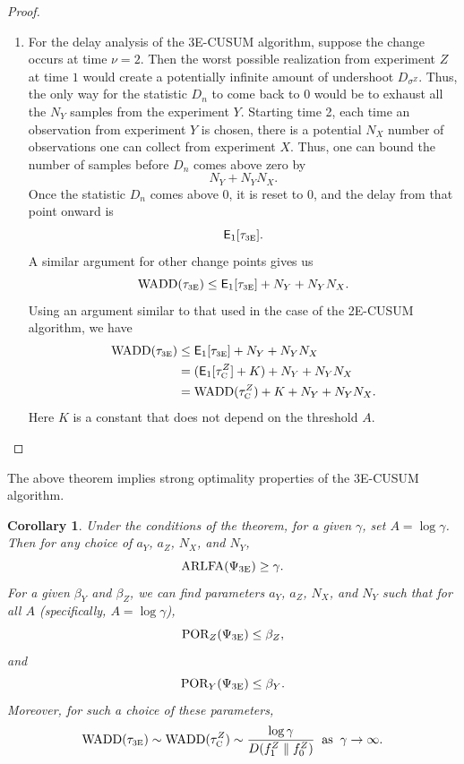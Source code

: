 \documentclass[journal, onecolumn]{IEEEtran}
\newtheorem{corollary}{Corollary}
\begin{document}
\begin{proof}
\begin{enumerate}
\item For the delay analysis of the 3E-CUSUM algorithm, suppose the change occurs at time $\nu = 2$. Then the worst possible realization from experiment $Z$ at time $1$ would create a potentially infinite amount of undershoot $D_{\sigma^Z}$. Thus, the only way for the statistic $D_n$ to come back to $0$ would be to exhaust all the $N_Y$ samples from the experiment $Y$. Starting time 2, each time an observation from experiment $Y$ is chosen, there is a potential $N_X$ number of observations one can collect from experiment $X$. Thus, one can bound the number of samples before $D_n$ comes above zero by 
$$ N_Y + N_Y N_X. $$
Once the statistic $D_n$ comes above $0$, it is reset to $0$, and the delay from that point onward is 
$$ \mathsf{E}_1 [\tau_{\textup{\fontsize{6 pt}{10 pt}\selectfont 3E}}]. $$
A similar argument for other change points gives us 
$$ \textup{WADD} (\tau_{\textup{\fontsize{6 pt}{10 pt}\selectfont 3E}}) \leq \mathsf{E}_1 [\tau_{\textup{\fontsize{6 pt}{10 pt}\selectfont 3E}}] + N_Y + N_Y N_X. $$
Using an argument similar to that used in the case of the 2E-CUSUM algorithm, we have
\begin{align*}
\textup{WADD} (\tau_{\textup{\fontsize{6 pt}{10 pt}\selectfont 3E}})
& \leq \mathsf{E}_1 [\tau_{\textup{\fontsize{6 pt}{10 pt}\selectfont 3E}}] + N_Y + N_Y N_X \\
& = (\mathsf{E}_1 [\tau_{\textup{\fontsize{6 pt}{10 pt}\selectfont C}}^Z] + K) + N_Y + N_Y N_X \\
& = \textup{WADD} (\tau_{\textup{\fontsize{6 pt}{10 pt}\selectfont C}}^Z) + K + N_Y + N_Y N_X.
\end{align*}
Here $K$ is a constant that does not depend on the threshold $A$. 
\end{enumerate}
\end{proof}

The above theorem implies strong optimality properties of the 3E-CUSUM algorithm. 

\begin{corollary}
Under the conditions of the theorem, for a given $\gamma$, set $A = \log \gamma$. Then for any choice of $a_Y$, $a_Z$, $N_X$, and $N_Y$,
$$ \textup{ARLFA} (\Psi_{\textup{3E}}) \geq \gamma. $$
For a given $\beta_Y$ and $\beta_Z$, we can find parameters $a_Y$, $a_Z$, $N_X$, and $N_Y$ such that for all $A$ (specifically, $A = \log \gamma$),
$$ \textup{POR}_Z (\Psi_{\textup{3E}}) \leq \beta_Z, $$
and
$$ \textup{POR}_Y (\Psi_{\textup{3E}}) \leq \beta_Y. $$
Moreover, for such a choice of these parameters, 
\begin{align*}
\textup{WADD} (\tau_{\textup{\fontsize{6 pt}{10 pt}\selectfont 3E}}) \sim \textup{WADD} (\tau_{\textup{\fontsize{6 pt}{10 pt}\selectfont C}}^Z) \sim \frac{\log \gamma}{D(f_1^Z \mathrel{\Vert} f_0^Z)} \;\; \text{as} \;\; \gamma \to \infty. 
\end{align*}
\end{corollary}
\end{document}
